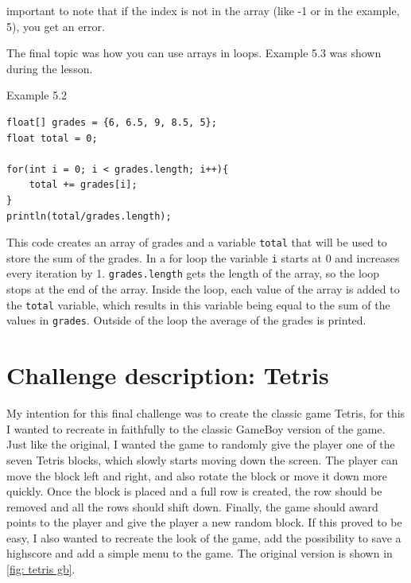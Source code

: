 important to note that if the index is not in the array (like -1 or in the example, 5), you get an error.

\newpage

The final topic was how you can use arrays in loops. Example 5.3 was shown during the lesson.

\begin{codebox}{Example 5.2}
    \begin{lstlisting}
float[] grades = {6, 6.5, 9, 8.5, 5};
float total = 0;

for(int i = 0; i < grades.length; i++){
    total += grades[i];
} 
println(total/grades.length);
    \end{lstlisting}
\end{codebox}

This code creates an array of grades and a variable \texttt{total} that will be used to store the sum of the grades. In a for loop the variable \texttt{i} starts at 0 and increases every iteration by 1. \texttt{grades.length} gets the length of the array, so the loop stops at the end of the array. Inside the loop, each value of the array is added to the \texttt{total} variable, which results in this variable being equal to the sum of the values in \texttt{grades}. Outside of the loop the average of the grades is printed. 

\section{Challenge description: Tetris}

My intention for this final challenge was to create the classic game Tetris, for this I wanted to recreate in faithfully to the classic GameBoy version of the game. Just like the original, I wanted the game to randomly give the player one of the seven Tetris blocks, which slowly starts moving down the screen. The player can move the block left and right, and also rotate the block or move it down more quickly. Once the block is placed and a full row is created, the row should be removed and all the rows should shift down. Finally, the game should award points to the player and give the player a new random block. If this proved to be easy, I also wanted to recreate the look of the game, add the possibility to save a highscore and add a simple menu to the game. The original version is shown in \cref{fig: tetris gb}.

